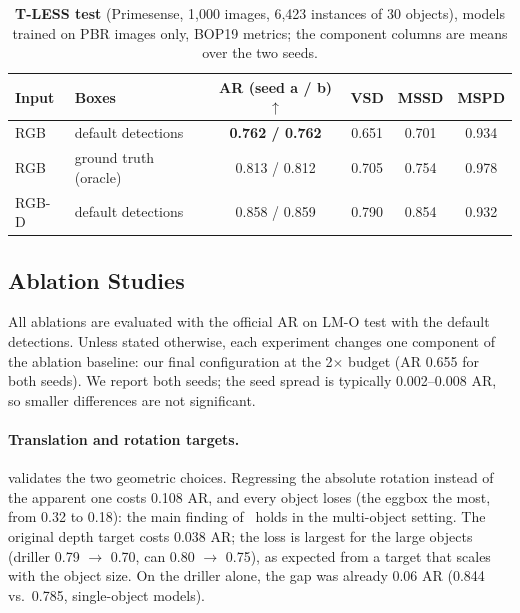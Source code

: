 \begin{table}[t]
  \centering
  \small
  \begin{tabular}{llcccc}
    \toprule
    Input & Boxes & AR (seed a / b)$\uparrow$ & VSD & MSSD & MSPD \\
    \midrule
    RGB & default detections & \textbf{0.762 / 0.762} & 0.651 & 0.701 & 0.934 \\
    RGB & ground truth (oracle) & 0.813 / 0.812 & 0.705 & 0.754 & 0.978 \\
    RGB-D & default detections & 0.858 / 0.859 & 0.790 & 0.854 & 0.932 \\
    \bottomrule
  \end{tabular}
  \caption{\textbf{T-LESS test} (Primesense, 1,000 images, 6,423 instances of 30 objects), models
  trained on PBR images only, BOP19 metrics; the component columns are means over the two seeds.}
  \label{tab:tless}
\end{table}

\subsection{Ablation Studies}
\label{sec:exp:ablations}
All ablations are evaluated with the official AR on LM-O test with the default detections. Unless
stated otherwise, each experiment changes one component of the ablation baseline: our final
configuration at the 2$\times$ budget (AR 0.655 for both seeds). We report both seeds; the seed
spread is typically 0.002--0.008 AR, so smaller differences are not significant.

\paragraph{Translation and rotation targets.}
 validates the two geometric choices. Regressing the absolute rotation
instead of the apparent one costs 0.108 AR, and every object loses (the eggbox the most, from
0.32 to 0.18): the main finding of~\cite{ancey2026fastposevit} holds in the multi-object setting.
The original depth target costs 0.038 AR; the loss is largest for the large objects (driller
0.79 $\rightarrow$ 0.70, can 0.80 $\rightarrow$ 0.75), as expected from a target that scales with
the object size. On the driller alone, the gap was already 0.06 AR (0.844 vs.\ 0.785, single-object
models).

